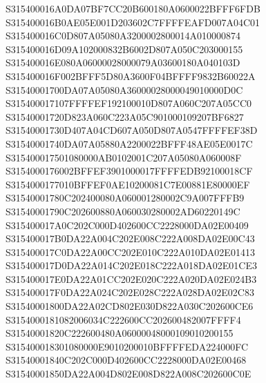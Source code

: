 \documentclass[12pt,a4paper]{article}
\begin{document}
\begin{framed}
{S315400016A0DA07BF7CC20B600180A0600022BFFF6FDB\newline
S315400016B0AE05E001D203602C7FFFFEAFD007A04C01\newline
S315400016C0D807A05080A3200002800014A010000874\newline
S315400016D09A102000832B6002D807A050C203000155\newline
S315400016E080A06000028000079A03600180A040103D\newline
S315400016F002BFFF5D80A3600F04BFFFF9832B60022A\newline
S31540001700DA07A05080A36000028000049010000D0C\newline
S315400017107FFFFEF192100010D807A060C207A05CC0\newline
S31540001720D823A060C223A05C901000109207BF6827\newline
S31540001730D407A04CD607A050D807A0547FFFFEF38D\newline
S31540001740DA07A05880A2200022BFFF48AE05E0017C\newline
S315400017501080000AB0102001C207A05080A060008F\newline
S3154000176002BFFEF3901000017FFFFEDB92100018CF\newline
S3154000177010BFFEF0AE10200081C7E00881E80000EF\newline
S31540001780C202400080A060001280002C9A007FFFB9\newline
S31540001790C202600880A060030280002AD60220149C\newline
S315400017A0C202C000D402600CC2228000DA02E00409\newline
S315400017B0DA22A004C202E008C222A008DA02E00C43\newline
S315400017C0DA22A00CC202E010C222A010DA02E01413\newline
S315400017D0DA22A014C202E018C222A018DA02E01CE3\newline
S315400017E0DA22A01CC202E020C222A020DA02E024B3\newline
S315400017F0DA22A024C202E028C222A028DA02E02C83\newline
S31540001800DA22A02CD802E030D822A030C202600CE6\newline
S3154000181082006034C222600CC202600482007FFFF4\newline
S31540001820C222600480A06000048000109010200155\newline
S315400018301080000E9010200010BFFFFEDA224000FC\newline
S31540001840C202C000D402600CC2228000DA02E00468\newline
S31540001850DA22A004D802E008D822A008C202600C0E\newline
}
\end{framed}
\end{document}

